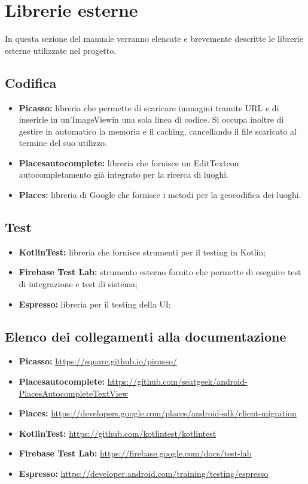 \section{Librerie esterne}
In questa sezione del manuale verranno elencate e brevemente descritte le librerie esterne utilizzate nel progetto.
\subsection{Codifica}
\begin{itemize}
	\item \textbf{Picasso:} libreria che permette di scaricare immagini tramite URL e di inserirle in un'ImageView\glosp in una sola linea di codice. Si occupa inoltre di gestire in automatico la memoria e il caching, cancellando il file scaricato al termine del suo utilizzo.
	\item \textbf{Placesautocomplete:} libreria che fornisce un EditText\glosp con autocompletamento già integrato per la ricerca di luoghi.
	\item \textbf{Places:} libreria di Google che fornisce i metodi per la geocodifica dei luoghi.
\end{itemize}
\subsection{Test}
\begin{itemize}
	\item \textbf{KotlinTest:} libreria che fornisce strumenti per il testing in Kotlin;
	\item \textbf{Firebase Test Lab:} strumento esterno fornito che permette di eseguire
	test di integrazione e test di sistema;

	\item \textbf{Espresso:} libreria per il testing della UI;
\end{itemize}
\subsection{Elenco dei collegamenti alla documentazione}
\begin{itemize}
	\item \textbf{Picasso:} \url{https://square.github.io/picasso/}
	\item \textbf{Placesautocomplete:}
	\url{https://github.com/seatgeek/android-PlacesAutocompleteTextView}
	\item \textbf{Places:}
	\url{https://developers.google.com/places/android-sdk/client-migration}
	\item \textbf{KotlinTest:}
	\url{https://github.com/kotlintest/kotlintest}
	\item \textbf{Firebase Test Lab:}
	\url{https://firebase.google.com/docs/test-lab}
	\item \textbf{Espresso:}
	\url{https://developer.android.com/training/testing/espresso}
\end{itemize}